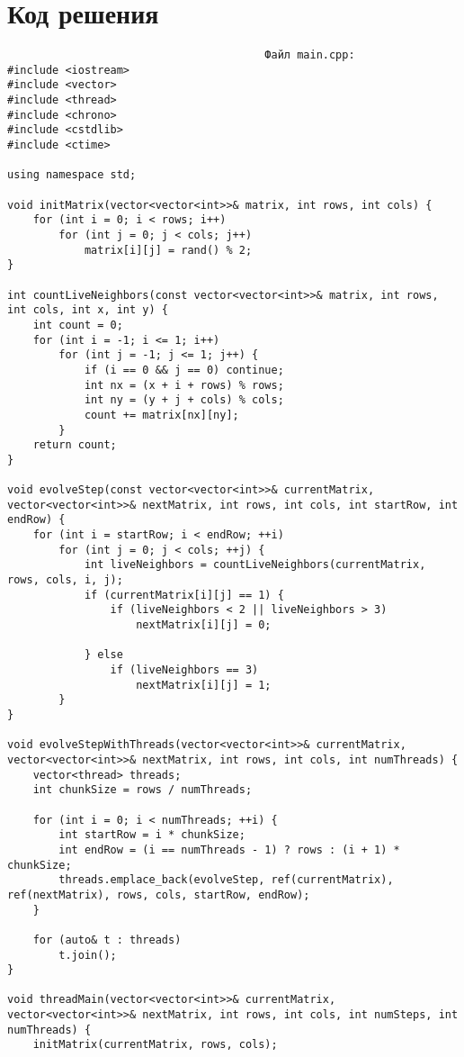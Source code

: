 \documentclass[a4paper, 14pt]{extarticle}
\begin{document}
\section{Код решения}
\begin{verbatim}
                                        Файл main.cpp:
#include <iostream>
#include <vector>
#include <thread>
#include <chrono>
#include <cstdlib>
#include <ctime>

using namespace std;

void initMatrix(vector<vector<int>>& matrix, int rows, int cols) {
    for (int i = 0; i < rows; i++) 
        for (int j = 0; j < cols; j++) 
            matrix[i][j] = rand() % 2;
}

int countLiveNeighbors(const vector<vector<int>>& matrix, int rows, int cols, int x, int y) {
    int count = 0;
    for (int i = -1; i <= 1; i++) 
        for (int j = -1; j <= 1; j++) {
            if (i == 0 && j == 0) continue;
            int nx = (x + i + rows) % rows;
            int ny = (y + j + cols) % cols;
            count += matrix[nx][ny];
        }
    return count;
}

void evolveStep(const vector<vector<int>>& currentMatrix, vector<vector<int>>& nextMatrix, int rows, int cols, int startRow, int endRow) {
    for (int i = startRow; i < endRow; ++i) 
        for (int j = 0; j < cols; ++j) {
            int liveNeighbors = countLiveNeighbors(currentMatrix, rows, cols, i, j);
            if (currentMatrix[i][j] == 1) {
                if (liveNeighbors < 2 || liveNeighbors > 3) 
                    nextMatrix[i][j] = 0;
                
            } else 
                if (liveNeighbors == 3) 
                    nextMatrix[i][j] = 1;  
        }
}

void evolveStepWithThreads(vector<vector<int>>& currentMatrix, vector<vector<int>>& nextMatrix, int rows, int cols, int numThreads) {
    vector<thread> threads;
    int chunkSize = rows / numThreads;

    for (int i = 0; i < numThreads; ++i) {
        int startRow = i * chunkSize;
        int endRow = (i == numThreads - 1) ? rows : (i + 1) * chunkSize;
        threads.emplace_back(evolveStep, ref(currentMatrix), ref(nextMatrix), rows, cols, startRow, endRow);
    }

    for (auto& t : threads)
        t.join();
}

void threadMain(vector<vector<int>>& currentMatrix, vector<vector<int>>& nextMatrix, int rows, int cols, int numSteps, int numThreads) {
    initMatrix(currentMatrix, rows, cols);


\end{verbatim}
\end{document}
